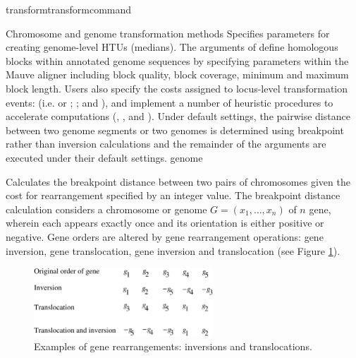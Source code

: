 \begin{command}{transform}{transformcommand}
\begin{arguments}
\begin{argumentgroup}{Chromosome and genome transformation methods}
                {Specifies parameters for creating genome-level HTUs (medians). 
                The arguments of  define 
                homologous blocks within annotated genome sequences by
                specifying parameters within the Mauve aligner \cite{darlingetal2004} 
                including block quality, block coverage, minimum and maximum block
                length. Users also specify the costs assigned to locus-level transformation 
                events: (i.e.   or 
                ; ; and 
                ), and implement a number of heuristic 
                procedures to accelerate computations (, 
                , and ).  
                Under default settings, the pairwise distance between two genome 
                segments or two genomes is determined using breakpoint rather 
                than inversion calculations and the remainder of the arguments are executed 
                under their default settings.}
                {genome}

                {Calculates the breakpoint distance \cite{blanchetteetal1997}
                between two pairs of chromosomes given the cost for rearrangement
                specified by an integer value.  The breakpoint distance calculation considers
                a chromosome or genome $G = (x_1, \ldots, x_n) $ of $n$ gene, wherein each
                appears exactly once and its orientation is either positive or negative.  Gene
                orders are altered by gene rearrangement operations: gene inversion, gene translocation,
                gene inversion and translocation (see Figure \ref{fig:genomeRearrangement}).  
                \bigskip
                \begin{figure} [!htbp]
                    \begin{center}
                        \includegraphics[width=0.6\textwidth]{doc/figures/genomeRearrangement.pdf}
                    \end{center}
                    \caption{Examples of gene rearrangements: inversions and translocations.}
                    \label{fig:genomeRearrangement}
                \end{figure}

}
\end{argumentgroup}
\end{arguments}
\end{command}
